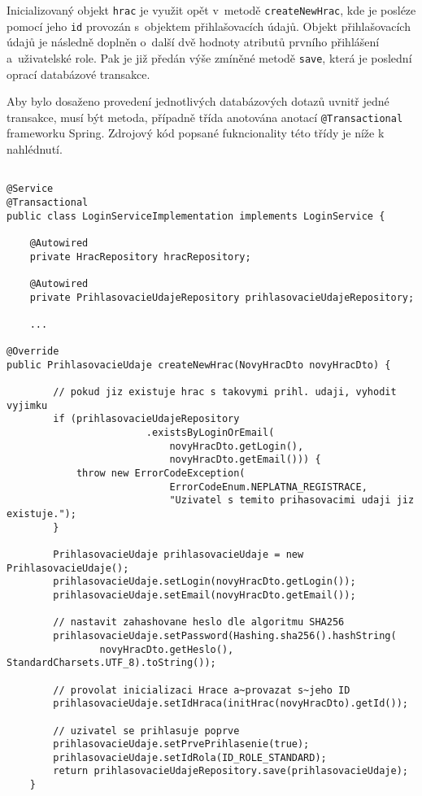 \documentclass[twoside, 12pt]{article}
\begin{document}
{Inicializovaný objekt \texttt{hrac} je využit opět v~metodě \texttt{createNewHrac},
kde je posléze pomocí jeho \texttt{id} provozán s~objektem přihlašovacích údajů.
Objekt přihlašovacích údajů je následně doplněn o~další dvě hodnoty atributů prvního přihlášení a~uživatelské role.
Pak je již předán výše zmíněné metodě \texttt{save}, která je poslední oprací databázové transakce.

Aby bylo dosaženo provedení jednotlivých databázových dotazů uvnitř jedné transakce,
musí být metoda, případně třída anotována anotací \texttt{@Transactional}
frameworku Spring. Zdrojový kód popsané fukncionality této třídy je níže k nahlédnutí.


\clearpage

\begin{lstlisting}

@Service
@Transactional
public class LoginServiceImplementation implements LoginService {

    @Autowired
    private HracRepository hracRepository;

    @Autowired
    private PrihlasovacieUdajeRepository prihlasovacieUdajeRepository;

    ...

@Override
public PrihlasovacieUdaje createNewHrac(NovyHracDto novyHracDto) {

        // pokud jiz existuje hrac s takovymi prihl. udaji, vyhodit vyjimku
        if (prihlasovacieUdajeRepository
                        .existsByLoginOrEmail(
                            novyHracDto.getLogin(),
                            novyHracDto.getEmail())) {
            throw new ErrorCodeException(
                            ErrorCodeEnum.NEPLATNA_REGISTRACE,
                            "Uzivatel s temito prihasovacimi udaji jiz existuje.");
        }

        PrihlasovacieUdaje prihlasovacieUdaje = new PrihlasovacieUdaje();
        prihlasovacieUdaje.setLogin(novyHracDto.getLogin());
        prihlasovacieUdaje.setEmail(novyHracDto.getEmail());

        // nastavit zahashovane heslo dle algoritmu SHA256
        prihlasovacieUdaje.setPassword(Hashing.sha256().hashString(
                novyHracDto.getHeslo(), StandardCharsets.UTF_8).toString());

        // provolat inicializaci Hrace a~provazat s~jeho ID
        prihlasovacieUdaje.setIdHraca(initHrac(novyHracDto).getId());

        // uzivatel se prihlasuje poprve
        prihlasovacieUdaje.setPrvePrihlasenie(true);
        prihlasovacieUdaje.setIdRola(ID_ROLE_STANDARD);
        return prihlasovacieUdajeRepository.save(prihlasovacieUdaje);
    }


\end{lstlisting}}
\end{document}
